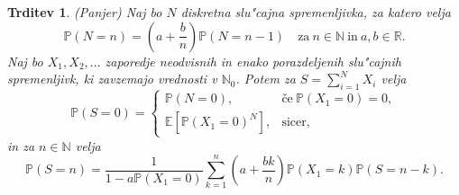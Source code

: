 \documentclass[12pt, a4paper, reqno]{amsart}
\theoremstyle{definition}
\theoremstyle{plain}
\newtheorem{trditev}[definicija]{Trditev}
\newcommand{\R}{\mathbb{R}}
\newcommand{\N}{\mathbb{N}}
\newcommand{\E}{\mathbb{E}}
\newcommand{\Prob}{\mathbb{P}}
\newcommand{\1}{\mathds{1}}
\begin{document}
    \begin{trditev}(Panjer)
        Naj bo $N$ diskretna slu"cajna spremenljivka, za katero velja 
        \begin{equation*}
            \Prob(N = n) = \left(a + \frac{b}{n}\right)\Prob\left(N = n-1\right) \quad \text{za} \ n\in\N \ \text{in} \ a, b \in \R.
        \end{equation*}
        Naj bo $X_1, X_2, \dots$ zaporedje neodvisnih in enako porazdeljenih slu"cajnih spremenljivk, ki 
        zavzemajo vrednosti v $\N_0$. Potem za $S = \sum_{i=1}^NX_i$ velja
        \begin{equation*}
        \Prob\left(S = 0\right) = 
        \begin{cases}
            \Prob\left(N = 0\right), & \text{če} \ \Prob(X_1 = 0) = 0, \\  
            \E\left[\Prob\left(X_1 = 0\right)^N\right], & \text{sicer}, 
        \end{cases}
        \end{equation*}
        in za $n\in\N$ velja
        \begin{equation}
            \Prob\left(S = n\right) = \frac{1}{1 - a\Prob\left(X_1 = 0\right)}\sum_{k = 1}^n\left(a + \frac{bk}{n}\right)\Prob\left(X_1 = k\right)\Prob\left(S = n - k\right).
            \label{eq:PanjerRecursionScheme}
        \end{equation}
        \label{tdr:PanjerRecursionScheme}
    \end{trditev}
\end{document}
